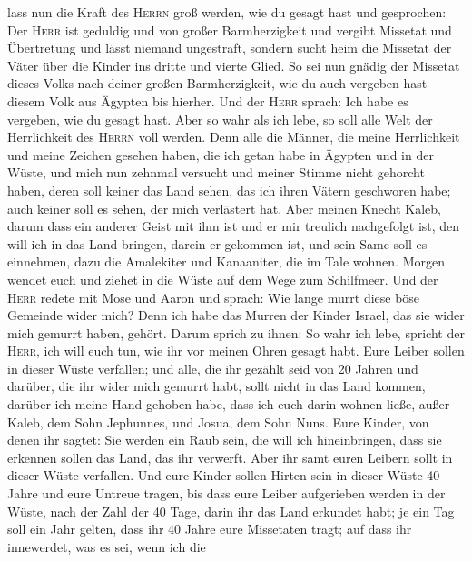 lass nun die Kraft des \textsc{Herrn} groß werden, wie du gesagt hast
und gesprochen:  Der \textsc{Herr} ist geduldig und von
großer Barmherzigkeit und vergibt Missetat und Übertretung und lässt
niemand ungestraft, sondern sucht heim die Missetat der Väter über die
Kinder ins dritte und vierte Glied.  So sei nun gnädig
der Missetat dieses Volks nach deiner großen Barmherzigkeit, wie du auch
vergeben hast diesem Volk aus Ägypten bis hierher.  Und
der \textsc{Herr} sprach: Ich habe es vergeben, wie du gesagt hast.
 Aber so wahr als ich lebe, so soll alle Welt der
Herrlichkeit des \textsc{Herrn} voll werden.  Denn alle
die Männer, die meine Herrlichkeit und meine Zeichen gesehen haben, die
ich getan habe in Ägypten und in der Wüste, und mich nun zehnmal
versucht und meiner Stimme nicht gehorcht haben,  deren
soll keiner das Land sehen, das ich ihren Vätern geschworen habe; auch
keiner soll es sehen, der mich verlästert hat.  Aber
meinen Knecht Kaleb, darum dass ein anderer Geist mit ihm ist und er mir
treulich nachgefolgt ist, den will ich in das Land bringen, darein er
gekommen ist, und sein Same soll es einnehmen,  dazu die
Amalekiter und Kanaaniter, die im Tale wohnen. Morgen wendet euch und
ziehet in die Wüste auf dem Wege zum Schilfmeer.  Und der
\textsc{Herr} redete mit Mose und Aaron und sprach:  Wie
lange murrt diese böse Gemeinde wider mich? Denn ich habe das Murren der
Kinder Israel, das sie wider mich gemurrt haben, gehört. 
Darum sprich zu ihnen: So wahr ich lebe, spricht der \textsc{Herr}, ich
will euch tun, wie ihr vor meinen Ohren gesagt habt. 
Eure Leiber sollen in dieser Wüste verfallen; und alle, die ihr gezählt
seid von 20 Jahren und darüber, die ihr wider mich gemurrt habt,
 sollt nicht in das Land kommen, darüber ich meine Hand
gehoben habe, dass ich euch darin wohnen ließe, außer Kaleb, dem Sohn
Jephunnes, und Josua, dem Sohn Nuns.  Eure Kinder, von
denen ihr sagtet: Sie werden ein Raub sein, die will ich hineinbringen,
dass sie erkennen sollen das Land, das ihr verwerft. 
Aber ihr samt euren Leibern sollt in dieser Wüste verfallen.
 Und eure Kinder sollen Hirten sein in dieser Wüste 40
Jahre und eure Untreue tragen, bis dass eure Leiber aufgerieben werden
in der Wüste,  nach der Zahl der 40 Tage, darin ihr das
Land erkundet habt; je ein Tag soll ein Jahr gelten, dass ihr 40 Jahre
eure Missetaten tragt; auf dass ihr innewerdet, was es sei, wenn ich die

